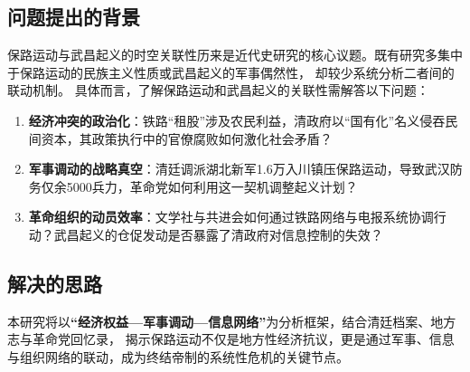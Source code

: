 \subsection{问题提出的背景}
保路运动与武昌起义的时空关联性历来是近代史研究的核心议题。既有研究多集中于保路运动的民族主义性质或武昌起义的军事偶然性，
却较少系统分析二者间的联动机制。
具体而言，了解保路运动和武昌起义的关联性需解答以下问题：

\begin{enumerate}
    \item \textbf{经济冲突的政治化}：铁路“租股”涉及农民利益，清政府以“国有化”名义侵吞民间资本，其政策执行中的官僚腐败如何激化社会矛盾？

    \item \textbf{军事调动的战略真空}：清廷调派湖北新军1.6万入川镇压保路运动，导致武汉防务仅余5000兵力，革命党如何利用这一契机调整起义计划？

    \item \textbf{革命组织的动员效率}：文学社与共进会如何通过铁路网络与电报系统协调行动？武昌起义的仓促发动是否暴露了清政府对信息控制的失效？
\end{enumerate}
\subsection{解决的思路}
本研究将以\textbf{“经济权益—军事调动—信息网络”}为分析框架，结合清廷档案、地方志与革命党回忆录，
揭示保路运动不仅是地方性经济抗议，更是通过军事、信息与组织网络的联动，成为终结帝制的系统性危机的关键节点。